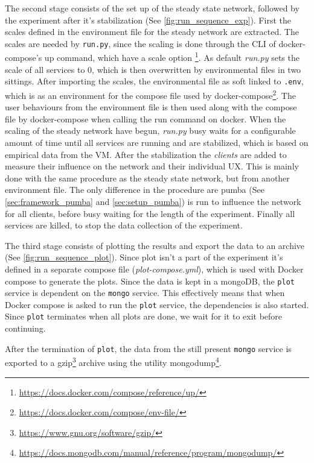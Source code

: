 The second stage consists of the set up of the steady state network, followed by the experiment after it's stabilization (See \autoref{fig:run_sequence_exp}). First the scales defined in the environment file for the steady network are extracted. The scales are needed by \texttt{run.py}, since the scaling is done through the \ac{CLI} of docker-compose's up command, which have a scale option \footnote{\url{https://docs.docker.com/compose/reference/up/}}. As default \textit{run.py} sets the scale of all services to 0, which is then overwritten by environmental files in two sittings.
After importing the scales, the environmental file as soft linked to \texttt{.env}, which is as an environment for the compose file used by docker-compose\footnote{\url{https://docs.docker.com/compose/env-file/}}.
The user behaviours from the environment file is then used along with the compose file by docker-compose when calling the run command on docker.
When the scaling of the steady network have begun, \textit{run.py} busy waits for a configurable amount of time until all services are running and are stabilized, which is based on empirical data from the \ac{VM}.
After the stabilization the \textit{clients} are added to measure their influence on the network and their individual \ac{UX}. This is mainly done with the same procedure as the steady state network, but from another environment file. The only difference in the procedure are pumba (See \autoref{sec:framework_pumba}
 and \ref{sec:setup_pumba}) is run to influence the network for all clients, before busy waiting for the length of the experiment.
Finally all services are killed, to stop the data collection of the experiment.



The third stage consists of plotting the results and export the data to an archive (See \autoref{fig:run_sequence_plot}). Since plot isn't a part of the experiment it's defined in a separate compose file (\textit{plot-compose.yml}), which is used with Docker compose to generate the plots. Since the data is kept in a mongoDB, the \texttt{plot} service is dependent on the \texttt{mongo} service. This effectively means that when Docker compose is asked to run the \texttt{plot} service, the dependencies is also started. Since \texttt{plot} terminates when all plots are done, we wait for it to exit before continuing.

After the termination of \texttt{plot}, the data from the still present \texttt{mongo} service is exported to a gzip\footnote{\url{https://www.gnu.org/software/gzip/}} archive using the utility mongodump\footnote{\url{https://docs.mongodb.com/manual/reference/program/mongodump/}}. 


